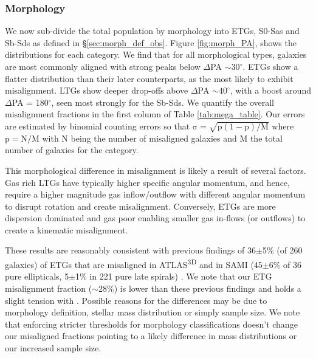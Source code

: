 \subsubsection{Morphology}
We now sub-divide the total population by morphology into ETGs, S0-Sas and Sb-Sds as defined in \S\ref{sec:morph_def_obs}. Figure \ref{fig:morph_PA}, shows the distributions for each category. We find that for all morphological types, galaxies are most commonly aligned with strong peaks below $\Delta$PA $\sim 30^{\circ}$. ETGs show a flatter distribution than their later counterparts, as the most likely to exhibit misalignment. LTGs show deeper drop-offs above $\Delta$PA $\sim 40^{\circ}$, with a boost around $\Delta$PA = 180$^{\circ}$, seen most strongly for the Sb-Sds. We quantify the overall misalignment fractions in the first column of Table \ref{tab:mega_table}. Our errors are estimated by binomial counting errors so that $\mathrm{\sigma = \sqrt{p(1-p) / M}}$ where $\mathrm{p = N/M}$ with $\mathrm{N}$ being the number of misaligned galaxies and $\mathrm{M}$ the total number of galaxies for the category.

This morphological difference in misalignment is likely a result of several factors. Gas rich LTGs have typically higher specific angular momentum, and hence, require a higher magnitude gas inflow/outflow with different angular momentum to disrupt rotation and create misalignment. Conversely, ETGs are more dispersion dominated and gas poor enabling smaller gas in-flows (or outflows) to create a kinematic misalignment. 

These results are reasonably consistent with previous findings of 36$\pm$5\% (of 260 galaxies) of ETGs that are misaligned in ATLAS\textsuperscript{3D} and in SAMI (45$\pm$6\% of 36 pure ellipticals, 5$\pm$1\% in 221 pure late spirals) \citep[][]{davis2011, bryant2019}. We note that our ETG misalignment fraction ($\sim$28\%) is lower than these previous findings and holds a slight tension with \citet{bryant2019}. Possible reasons for the differences may be due to morphology definition, stellar mass distribution or simply sample size. We note that enforcing stricter thresholds for morphology classifications doesn't change our misaligned fractions pointing to a likely difference in mass distributions or our increased sample size. 

